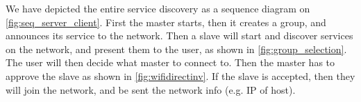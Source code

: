 We have depicted the entire service discovery as a sequence diagram on \cref{fig:seq_server_client}.
First the master starts, then it creates a group, and announces its service to the network.
Then a slave will start and discover services on the network, and present them to the user, as shown in \cref{fig:group_selection}.
The user will then decide what master to connect to.
Then the master has to approve the slave as shown in \cref{fig:wifidirectinv}.
If the slave is accepted, then they will join the network, and be sent the network info (e.g. IP of host).
\tikzexternaldisable{}
\begin{figure}[h]
\end{figure}

